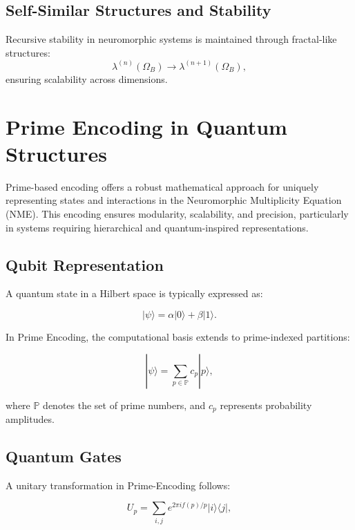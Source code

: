 \documentclass{article}
\theoremstyle{plain}
\begin{document}
\subsection{Self-Similar Structures and Stability}
Recursive stability in neuromorphic systems is maintained through fractal-like structures:
\begin{equation}
\lambda^{(n)}(\Omega_B) \to \lambda^{(n+1)}(\Omega_B),
\end{equation}
ensuring scalability across dimensions.




\section{Prime Encoding in Quantum Structures}

Prime-based encoding offers a robust mathematical approach for uniquely representing states and interactions in the Neuromorphic Multiplicity Equation (NME). This encoding ensures modularity, scalability, and precision, particularly in systems requiring hierarchical and quantum-inspired representations.

\subsection{Qubit Representation}
A quantum state in a Hilbert space is typically expressed as:

\begin{equation}
|\psi\rangle = \alpha |0\rangle + \beta |1\rangle.
\end{equation}

In Prime Encoding, the computational basis extends to prime-indexed partitions:

\begin{equation}
|\psi\rangle = \sum_{p \in \mathbb{P}} c_p |p\rangle,
\end{equation}

where \( \mathbb{P} \) denotes the set of prime numbers, and \( c_p \) represents probability amplitudes.

\subsection{Quantum Gates}
A unitary transformation in Prime-Encoding follows:

\begin{equation}
U_p = \sum_{i,j} e^{2\pi i f(p) / p} |i\rangle \langle j|,
\end{equation}
\end{document}
